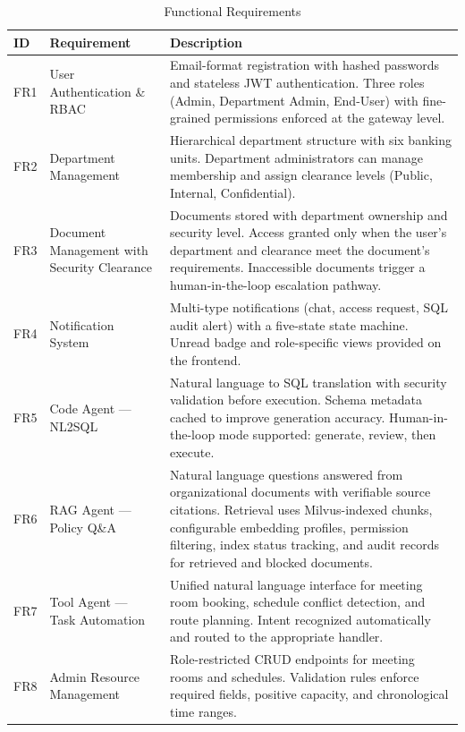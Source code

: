 \begin{table}[H]
\centering
\small\singlespacing
\caption{Functional Requirements}
\label{tab:functional-requirements}
\begin{tabularx}{\textwidth}{>{\RaggedRight\arraybackslash}p{}>{\RaggedRight\arraybackslash}p{}>{\RaggedRight\arraybackslash}X}
\toprule
\textbf{ID} & \textbf{Requirement} & \textbf{Description} \\
\midrule
FR1 & User Authentication \& RBAC & Email-format registration with hashed passwords and stateless JWT authentication. Three roles (Admin, Department Admin, End-User) with fine-grained permissions enforced at the gateway level. \\
\addlinespace
FR2 & Department Management & Hierarchical department structure with six banking units. Department administrators can manage membership and assign clearance levels (Public, Internal, Confidential). \\
\addlinespace
FR3 & Document Management with Security Clearance & Documents stored with department ownership and security level. Access granted only when the user's department and clearance meet the document's requirements. Inaccessible documents trigger a human-in-the-loop escalation pathway. \\
\addlinespace
FR4 & Notification System & Multi-type notifications (chat, access request, SQL audit alert) with a five-state state machine. Unread badge and role-specific views provided on the frontend. \\
\addlinespace
FR5 & Code Agent --- NL2SQL & Natural language to SQL translation with security validation before execution. Schema metadata cached to improve generation accuracy. Human-in-the-loop mode supported: generate, review, then execute. \\
\addlinespace
FR6 & RAG Agent --- Policy Q\&A & Natural language questions answered from organizational documents with verifiable source citations. Retrieval uses Milvus-indexed chunks, configurable embedding profiles, permission filtering, index status tracking, and audit records for retrieved and blocked documents. \\
\addlinespace
FR7 & Tool Agent --- Task Automation & Unified natural language interface for meeting room booking, schedule conflict detection, and route planning. Intent recognized automatically and routed to the appropriate handler. \\
\addlinespace
FR8 & Admin Resource Management & Role-restricted CRUD endpoints for meeting rooms and schedules. Validation rules enforce required fields, positive capacity, and chronological time ranges. \\
\bottomrule
\end{tabularx}
\end{table}

